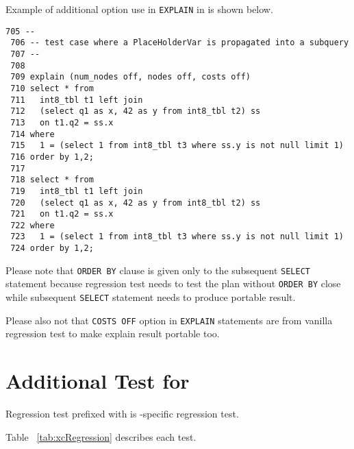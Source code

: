   Example of additional option use in \texttt{EXPLAIN} in  is shown below.

  \lstset{tabsize=4, xleftmargin=20pt, basicstyle=\ttfamily\small, breaklines=true}
  \begin{lstlisting}[frame=single]
 705 --
 706 -- test case where a PlaceHolderVar is propagated into a subquery
 707 --
 708 
 709 explain (num_nodes off, nodes off, costs off)
 710 select * from
 711   int8_tbl t1 left join
 712   (select q1 as x, 42 as y from int8_tbl t2) ss
 713   on t1.q2 = ss.x
 714 where
 715   1 = (select 1 from int8_tbl t3 where ss.y is not null limit 1)
 716 order by 1,2;
 717 
 718 select * from
 719   int8_tbl t1 left join
 720   (select q1 as x, 42 as y from int8_tbl t2) ss
 721   on t1.q2 = ss.x
 722 where
 723   1 = (select 1 from int8_tbl t3 where ss.y is not null limit 1)
 724 order by 1,2;
  \end{lstlisting}
    
  Please note that \texttt{ORDER BY} clause is given only to the subsequent \texttt{SELECT} statement
  because regression test needs to test the plan without \texttt{ORDER BY} close while subsequent
  \texttt{SELECT} statement needs to produce portable result.

  Please also not that \texttt{COSTS OFF} option in \texttt{EXPLAIN} statements are from vanilla
  \PG{} regression test to make explain result portable too.



\section{Additional Test for \XC}

  Regression test prefixed with  is \XC-specific regression test.
  
  Table~ \ref{tab:xcRegression} describes each test.
  
